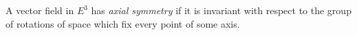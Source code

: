 A vector field in $E^3$ has \textit{axial symmetry} if it is invariant with respect to the group of rotations of space which fix every point of some axis.
